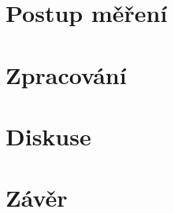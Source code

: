\section{Postup měření}



%
\section{Zpracování}

% 
% 


\section{Diskuse}

%
			
\section{Závěr}
